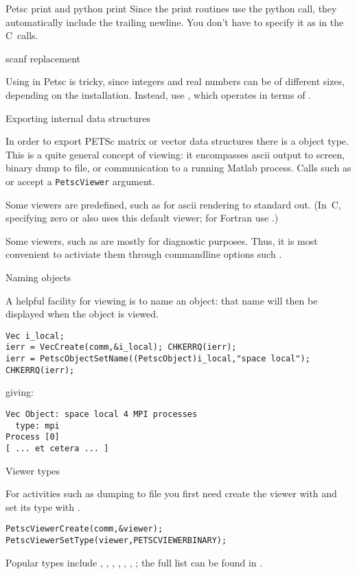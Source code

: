 \begin{pythonnote}{Petsc print and python print}
  Since the print routines use the python  call, they
  automatically include the trailing newline. You don't have to
  specify it as in the C~calls.
\end{pythonnote}

 {scanf replacement}

Using  in Petsc is tricky, since integers and real numbers can be
of different sizes, depending on the installation.
Instead, use , which operates in terms of
.

 {Exporting internal data structures}

In order to export PETSc matrix or vector data structures
there is a  object type.
This is a quite general concept of viewing: it encompasses ascii output to screen,
binary dump to file, or communication to a running Matlab process.
Calls such as   or 
accept a \lstinline{PetscViewer} argument.

Some viewers are predefined, such as
 for ascii rendering to
standard out. (In~C, specifying zero or  also uses this
default viewer; for Fortran use .)

Some viewers, such as  are mostly for
diagnostic purposes.  Thus, it is most convenient to activiate them
through commandline options such .

 {Naming objects}

A helpful facility for viewing is to name an object:
that name will then be displayed when the object is viewed.
\begin{lstlisting}
Vec i_local;
ierr = VecCreate(comm,&i_local); CHKERRQ(ierr);
ierr = PetscObjectSetName((PetscObject)i_local,"space local"); CHKERRQ(ierr);
\end{lstlisting}
giving:
\begin{verbatim}
Vec Object: space local 4 MPI processes
  type: mpi
Process [0]
[ ... et cetera ... ]
\end{verbatim}

 {Viewer types}

For activities such as dumping to file
you first need create the viewer
with 
and set its type with .
\begin{lstlisting}
PetscViewerCreate(comm,&viewer);
PetscViewerSetType(viewer,PETSCVIEWERBINARY);  
\end{lstlisting}
Popular types include
,
,
,
,
,
,
;
the full list can be found in .

